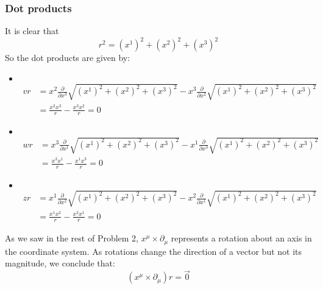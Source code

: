 \documentclass{article}
\begin{document}
 		\subsubsection{Dot products}
 			It is clear that
 			$$ r^2 = (x^1)^2 + (x^2)^2 + (x^3)^2$$
 			So the dot products are given by:
 			\begin{itemize}
 				\item $ $\vspace{-1cm}
 					\begin{align*}
 						vr &= x^2 \frac{\partial}{\partial x^3} \sqrt{(x^1)^2 + (x^2)^2 + (x^3)^2} - x^3 \frac{\partial}{\partial x^2} \sqrt{(x^1)^2 + (x^2)^2 + (x^3)^2} \\
 						&= \frac{x^2 x^3}{r} - \frac{x^3 x^2}{r} = 0
 					\end{align*}
 				\item $ $\vspace{-1cm}
 					\begin{align*}
 						wr &= x^3 \frac{\partial}{\partial x^1} \sqrt{(x^1)^2 + (x^2)^2 + (x^3)^2} - x^1 \frac{\partial}{\partial x^3} \sqrt{(x^1)^2 + (x^2)^2 + (x^3)^2} \\
 						&= \frac{x^3 x^1}{r} - \frac{x^1 x^3}{r} = 0
 					\end{align*}
 				\item $ $\vspace{-1cm}
	 				\begin{align*}
	 					zr &= x^1 \frac{\partial}{\partial x^2} \sqrt{(x^1)^2 + (x^2)^2 + (x^3)^2} - x^2 \frac{\partial}{\partial x^1} \sqrt{(x^1)^2 + (x^2)^2 + (x^3)^2} \\
	 					&= \frac{x^1 x^2}{r} - \frac{x^2 x^1}{r} = 0
	 				\end{align*}
 			\end{itemize}
 			As we saw in the rest of Problem 2, $x^\mu \times \partial_\mu$ represents a rotation about an axis in the coordinate system. As rotations change the direction of a vector but not its magnitude, we conclude that:
 			$$ (x^\mu \times \partial_\mu)r = \vec{0}$$
\end{document}
